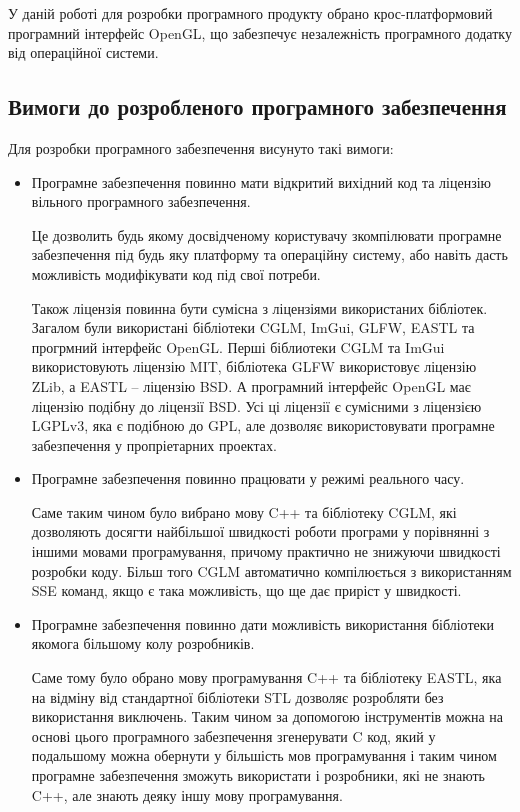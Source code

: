 \let\mypdfximage\pdfximage\def\pdfximage{\immediate\mypdfximage}\documentclass[14pt,a4paper]{extarticle}
\theoremstyle{definition}
\renewcommand{\[}{\begin{singlespace}\begin{equation*}}
\renewcommand{\]}{\end{equation*}\end{singlespace}}
\renewcommand{\+}{\discretionary{\mbox{\scriptsize$\hookleftarrow$}}{}{}}
\begin{document}
У даній роботі для розробки програмного продукту обрано крос-платформовий програмний інтерфейс OpenGL, що забезпечує незалежність програмного додатку від операційної системи.

\subsection{Вимоги до розробленого програмного забезпечення}

Для розробки програмного забезпечення висунуто такі вимоги:
\begin{itemize}
\item Програмне забезпечення повинно мати відкритий вихідний код та ліцензію вільного програмного забезпечення.

Це дозволить будь якому досвідченому користувачу зкомпілювати програмне забезпечення під будь яку платформу та операційну систему, або навіть дасть можливість модифікувати код під свої потреби.

Також ліцензія повинна бути сумісна з ліцензіями використаних бібліотек. Загалом були використані бібліотеки CGLM, ImGui, GLFW, EASTL та прогрмний інтерфейс OpenGL. Перші біблиотеки CGLM та ImGui використовують ліцензію MIT, бібліотека GLFW використовує ліцензію ZLib, а EASTL -- ліцензію BSD. А програмний інтерфейс OpenGL має ліцензію подібну до ліцензії BSD. Усі ці ліцензії є сумісними з ліцензією LGPLv3, яка є подібною до GPL, але дозволяє використовувати програмне забезпечення у пропріетарних проектах.

\item Програмне забезпечення повинно працювати у режимі реального часу.

Саме таким чином було вибрано мову C++ та бібліотеку CGLM, які дозволяють досягти найбільшої швидкості роботи програми у порівнянні з іншими мовами програмування, причому практично не знижуючи швидкості розробки коду. Більш того CGLM автоматично компілюється з використанням SSE команд, якщо є така можливість, що ще дає приріст у швидкості.

\item Програмне забезпечення повинно дати можливість використання бібліотеки якомога більшому колу розробників.

Саме тому було обрано мову програмування C++ та бібліотеку EASTL, яка на відміну від стандартної бібліотеки STL дозволяє розробляти без використання виключень. Таким чином за допомогою інструментів можна на основі цього програмного забезпечення згенерувати C код, який у подальшому можна обернути у більшість мов програмування і таким чином програмне забезпечення зможуть використати і розробники, які не знають C++, але знають деяку іншу мову програмування.


\end{itemize}
\end{document}
